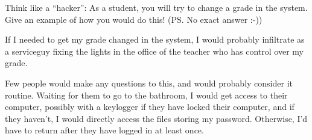 \documentclass{myassignment}
\begin{document}
	\begin{problem}
		Think like a ``hacker'': As a student, you will try to change a grade in the system. Give an example of how you would do this! (PS. No exact answer :-))%
	\end{problem}

	\begin{answer}
		If I needed to get my grade changed in the system, I would probably infiltrate as a serviceguy fixing the lights in the office of the teacher who has control over my grade. 

		Few people would make any questions to this, and would probably consider it routine. Waiting for them to go to the bathroom, I would get access to their computer, possibly with a keylogger if they have locked their computer, and if they haven't, I would directly access the files storing my password. Otherwise, I'd have to return after they have logged in at least once.
	\end{answer}
\end{document}
